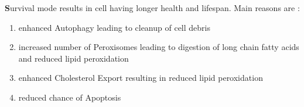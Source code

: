 \textbf Survival mode results in cell having longer health and lifespan. Main reasons are :
\begin{enumerate}
\item enhanced Autophagy leading to cleanup of cell debris
\item increased number of Peroxisomes leading to digestion of long chain fatty acids and reduced lipid peroxidation
\item enhanced Cholesterol Export resulting in reduced lipid peroxidation
\item reduced chance of Apoptosis
\end{enumerate}